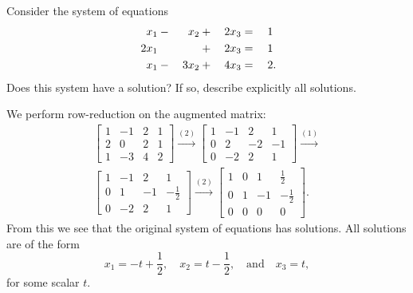  Consider the system of equations
\begin{alignat*}{4}
  x_1 &{}-{}& x_2 &{}+{}& 2x_3 &{}={}& 1 \\
  2x_1 && &{}+{}& 2x_3 &{}={}& 1 \\
  x_1 &{}-{}& 3x_2 &{}+{}& 4x_3 &{}={}& 2\rlap.
\end{alignat*}
Does this system have a solution? If so, describe explicitly all
solutions.
\begin{solution}
  We perform row-reduction on the augmented matrix:
  \begin{gather*}
    \begin{bmatrix}
      1 & -1 & 2 & 1 \\
      2 & 0 & 2 & 1 \\
      1 & -3 & 4 & 2
    \end{bmatrix}
    \xrightarrow{(2)}
    \begin{bmatrix}
      1 & -1 & 2 & 1 \\
      0 & 2 & -2 & -1 \\
      0 & -2 & 2 & 1
    \end{bmatrix}
    \xrightarrow{(1)} \\
    \begin{bmatrix}
      1 & -1 & 2 & 1 \\
      0 & 1 & -1 & -\frac12 \\
      0 & -2 & 2 & 1
    \end{bmatrix}
    \xrightarrow{(2)}
    \begin{bmatrix}
      1 & 0 & 1 & \frac12 \\[3pt]
      0 & 1 & -1 & -\frac12 \\[3pt]
      0 & 0 & 0 & 0
    \end{bmatrix}.
  \end{gather*}
  From this we see that the original system of equations has
  solutions. All solutions are of the form
  \begin{equation*}
    x_1 = -t + \frac12,
    \quad
    x_2 = t - \frac12,
    \quad\text{and}\quad
    x_3 = t,
  \end{equation*}
  for some scalar $t$.
\end{solution}
